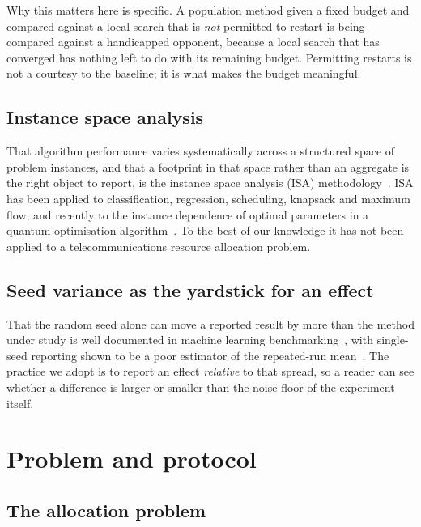 \documentclass[runningheads]{llncs}
\begin{document}
Why this matters here is specific. A population method given a fixed budget and compared against
a local search that is \emph{not} permitted to restart is being compared against a handicapped
opponent, because a local search that has converged has nothing left to do with its remaining
budget. Permitting restarts is not a courtesy to the baseline; it is what makes the budget
meaningful.

\subsection{Instance space analysis}

That algorithm performance varies systematically across a structured space of problem instances,
and that a footprint in that space rather than an aggregate is the right object to report, is the
instance space analysis (ISA) methodology~\cite{isa,isatools}. ISA has been applied to
classification, regression, scheduling, knapsack and maximum flow, and recently to the instance
dependence of optimal parameters in a quantum optimisation algorithm~\cite{isaqaoa}. To the best
of our knowledge it has not been applied to a telecommunications resource allocation problem.

\subsection{Seed variance as the yardstick for an effect}

That the random seed alone can move a reported result by more than the method under study is well
documented in machine learning benchmarking~\cite{seedrl,twovariances}, with single-seed
reporting shown to be a poor estimator of the repeated-run mean~\cite{twovariances}. The practice
we adopt is to report an effect \emph{relative} to that spread, so a reader can see whether a
difference is larger or smaller than the noise floor of the experiment itself.

\section{Problem and protocol}
\label{sec:protocol}

\subsection{The allocation problem}
\end{document}
